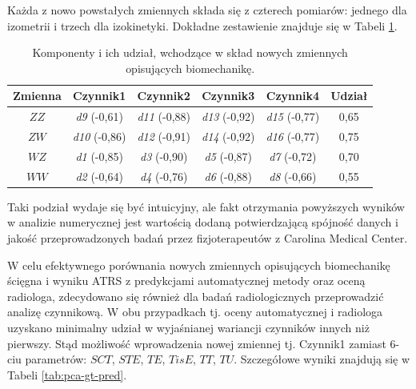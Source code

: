 Każda z nowo powstałych zmiennych składa się z czterech pomiarów: jednego dla izometrii i trzech dla izokinetyki. Dokładne zestawienie znajduje się w Tabeli \ref{tab:bio-new-factors}.
\begin{table}[h!]
	\centering
	\setlength{\tabcolsep}{3pt}
	\setlength\extrarowheight{2pt}
	\caption{Komponenty i ich udział, wchodzące w skład nowych zmiennych opisujących biomechanikę.}
	\label{tab:bio-new-factors}
	\begin{tabular}{c|c|c|c|c||c}
		Zmienna&Czynnik1&Czynnik2&Czynnik3&Czynnik4&Udział \\
		\hline \hline
		$ZZ$&\textit{d9} (-0,61)&\textit{d11} (-0,88)&\textit{d13} (-0,92)&\textit{d15} (-0,77)&0,65\\
		\hline
		$ZW$&\textit{d10} (-0,86)&\textit{d12} (-0,91)&\textit{d14} (-0,92)&\textit{d16} (-0,77)&0,75\\
		\hline
		$WZ$&\textit{d1} (-0,85)&\textit{d3} (-0,90)&\textit{d5} (-0,87)&\textit{d7} (-0,72)&0,70\\
		\hline
		$WW$&\textit{d2} (-0,64)&\textit{d4} (-0,76)&\textit{d6} (-0,88)&\textit{d8} (-0,66)&0,55\\
		
		
	\end{tabular}
\end{table}

Taki podział wydaje się być intuicyjny, ale fakt otrzymania powyższych wyników w analizie numerycznej jest wartością dodaną potwierdzającą spójność danych i jakość przeprowadzonych badań przez fizjoterapeutów z Carolina Medical Center. 

W celu efektywnego porównania nowych zmiennych opisujących biomechanikę ścięgna i wyniku ATRS z predykcjami automatycznej metody oraz oceną radiologa, zdecydowano się również dla badań radiologicznych przeprowadzić analizę czynnikową. W obu przypadkach tj. oceny automatycznej i radiologa uzyskano minimalny udział w wyjaśnianej wariancji czynników innych niż pierwszy. Stąd możliwość wprowadzenia nowej zmiennej tj. Czynnik1 zamiast 6-ciu parametrów: $SCT$, $STE$, $TE$, $TisE$, $TT$, $TU$. Szczegółowe wyniki znajdują się w Tabeli \ref{tab:pca-gt-pred}.

